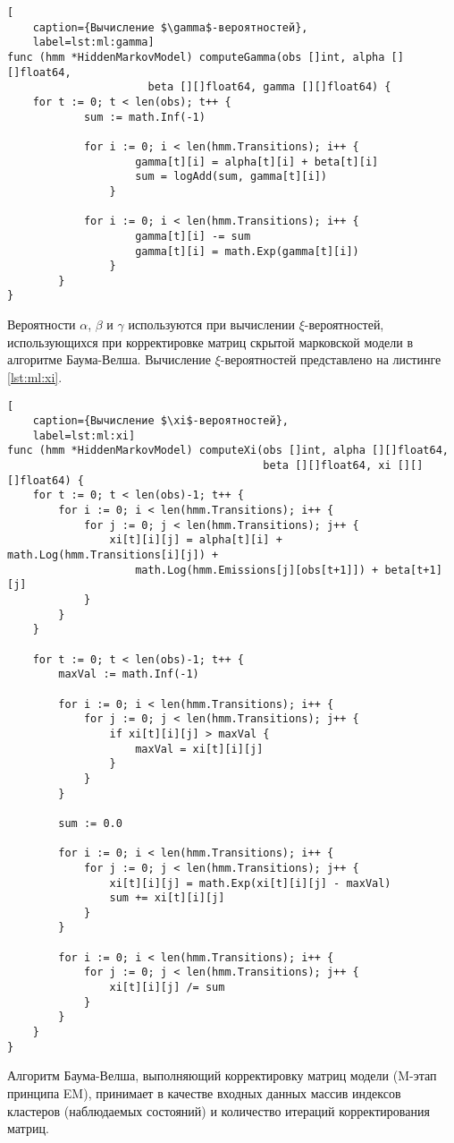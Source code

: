 \begin{lstlisting}[
	caption={Вычисление $\gamma$-вероятностей},
	label=lst:ml:gamma]
func (hmm *HiddenMarkovModel) computeGamma(obs []int, alpha [][]float64, 
					  beta [][]float64, gamma [][]float64) {
	for t := 0; t < len(obs); t++ {
			sum := math.Inf(-1)
			
			for i := 0; i < len(hmm.Transitions); i++ {
					gamma[t][i] = alpha[t][i] + beta[t][i]
					sum = logAdd(sum, gamma[t][i])
				}
			
			for i := 0; i < len(hmm.Transitions); i++ {
					gamma[t][i] -= sum
					gamma[t][i] = math.Exp(gamma[t][i])
				}
		}
}
\end{lstlisting}
Вероятности $\alpha$, $\beta$ и $\gamma$ используются при вычислении $\xi$-вероятностей, использующихся при корректировке матриц скрытой марковской модели в алгоритме Баума-Велша. Вычисление $\xi$-вероятностей представлено на листинге  \ref{lst:ml:xi}.
\begin{lstlisting}[
	caption={Вычисление $\xi$-вероятностей},
	label=lst:ml:xi]
func (hmm *HiddenMarkovModel) computeXi(obs []int, alpha [][]float64, 
										beta [][]float64, xi [][][]float64) {
	for t := 0; t < len(obs)-1; t++ {
		for i := 0; i < len(hmm.Transitions); i++ {
			for j := 0; j < len(hmm.Transitions); j++ {
				xi[t][i][j] = alpha[t][i] + math.Log(hmm.Transitions[i][j]) +
					math.Log(hmm.Emissions[j][obs[t+1]]) + beta[t+1][j]
			}
		}
	}
	
	for t := 0; t < len(obs)-1; t++ {
		maxVal := math.Inf(-1)
		
		for i := 0; i < len(hmm.Transitions); i++ {
			for j := 0; j < len(hmm.Transitions); j++ {
				if xi[t][i][j] > maxVal {
					maxVal = xi[t][i][j]
				}
			}
		}
		
		sum := 0.0
		
		for i := 0; i < len(hmm.Transitions); i++ {
			for j := 0; j < len(hmm.Transitions); j++ {
				xi[t][i][j] = math.Exp(xi[t][i][j] - maxVal)
				sum += xi[t][i][j]
			}
		}
		
		for i := 0; i < len(hmm.Transitions); i++ {
			for j := 0; j < len(hmm.Transitions); j++ {
				xi[t][i][j] /= sum
			}
		}
	}
}
\end{lstlisting}
Алгоритм Баума-Велша, выполняющий корректировку матриц модели (M-этап принципа EM), принимает в качестве входных данных массив индексов кластеров (наблюдаемых состояний) и количество итераций корректирования матриц. 

